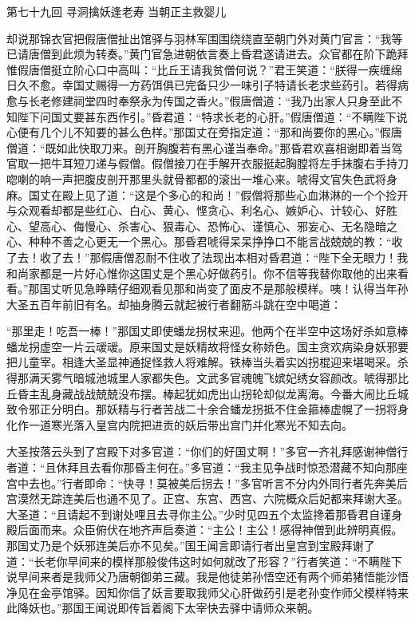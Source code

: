 \documentclass[12pt,UTF8]{ctexbook}
\begin{document}
{	第七十九回 寻洞擒妖逢老寿 当朝正主救婴儿
	
	却说那锦衣官把假唐僧扯出馆驿与羽林军围围绕绕直至朝门外对黄门官言：“我等已请唐僧到此烦为转奏。”黄门官急进朝依言奏上昏君遂请进去。众官都在阶下跪拜惟假唐僧挺立阶心口中高叫：“比丘王请我贫僧何说？”君王笑道：“朕得一疾缠绵日久不愈。幸国丈赐得一方药饵俱已完备只少一味引子特请长老求些药引。若得病愈与长老修建祠堂四时奉祭永为传国之香火。”假唐僧道：“我乃出家人只身至此不知陛下问国丈要甚东西作引。”昏君道：“特求长老的心肝。”假唐僧道：“不瞒陛下说心便有几个儿不知要的甚么色样。”那国丈在旁指定道：“那和尚要你的黑心。”假唐僧道：“既如此快取刀来。剖开胸腹若有黑心谨当奉命。”那昏君欢喜相谢即着当驾官取一把牛耳短刀递与假僧。假僧接刀在手解开衣服挺起胸膛将左手抹腹右手持刀唿喇的响一声把腹皮剖开那里头就骨都都的滚出一堆心来。唬得文官失色武将身麻。国丈在殿上见了道：“这是个多心的和尚！”假僧将那些心血淋淋的一个个捡开与众观看却都是些红心、白心、黄心、悭贪心、利名心、嫉妒心、计较心、好胜心、望高心、侮慢心、杀害心、狠毒心、恐怖心、谨慎心、邪妄心、无名隐暗之心、种种不善之心更无一个黑心。那昏君唬得呆呆挣挣口不能言战兢兢的教：“收了去！收了去！”那假唐僧忍耐不住收了法现出本相对昏君道：“陛下全无眼力！我和尚家都是一片好心惟你这国丈是个黑心好做药引。你不信等我替你取他的出来看看。”那国丈听见急睁睛仔细观看见那和尚变了面皮不是那般模样。咦！认得当年孙大圣五百年前旧有名。却抽身腾云就起被行者翻筋斗跳在空中喝道：
	
	“那里走！吃吾一棒！”那国丈即使蟠龙拐杖来迎。他两个在半空中这场好杀如意棒蟠龙拐虚空一片云叆叆。原来国丈是妖精故将怪女称娇色。国主贪欢病染身妖邪要把儿童宰。相逢大圣显神通捉怪救人将难解。铁棒当头着实凶拐棍迎来堪喝采。杀得那满天雾气暗城池城里人家都失色。文武多官魂魄飞嫔妃绣女容颜改。唬得那比丘昏主乱身藏战战兢兢没布摆。棒起犹如虎出山拐轮却似龙离海。今番大闹比丘城致令邪正分明白。那妖精与行者苦战二十余合蟠龙拐抵不住金箍棒虚幌了一拐将身化作一道寒光落入皇宫内院把进贡的妖后带出宫门并化寒光不知去向。
	
	大圣按落云头到了宫殿下对多官道：“你们的好国丈啊！”多官一齐礼拜感谢神僧行者道：“且休拜且去看你那昏主何在。”多官道：“我主见争战时惊恐潜藏不知向那座宫中去也。”行者即命：“快寻！莫被美后拐去！”多官听言不分内外同行者先奔美后宫漠然无踪连美后也通不见了。正宫、东宫、西宫、六院概众后妃都来拜谢大圣。大圣道：“且请起不到谢处哩且去寻你主公。”少时见四五个太监搀着那昏君自谨身殿后面而来。众臣俯伏在地齐声启奏道：“主公！主公！感得神僧到此辨明真假。那国丈乃是个妖邪连美后亦不见矣。”国王闻言即请行者出皇宫到宝殿拜谢了道：“长老你早间来的模样那般俊伟这时如何就改了形容？”行者笑道：“不瞒陛下说早间来者是我师父乃唐朝御弟三藏。我是他徒弟孙悟空还有两个师弟猪悟能沙悟净见在金亭馆驿。因知你信了妖言要取我师父心肝做药引是老孙变作师父模样特来此降妖也。”那国王闻说即传旨着阁下太宰快去驿中请师众来朝。
	
}
\end{document}
